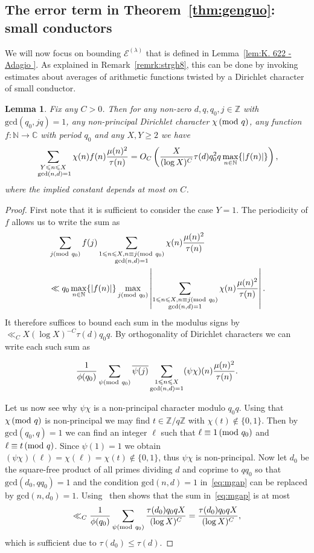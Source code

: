 \documentclass[a4paper,12pt,reqno]{amsart}
\numberwithin{equation}{section} \numberwithin{figure}{section}
\newcommand\Z{\mathbb{Z}}
\newcommand\N{\mathbb{N}}
\newcommand{\md}[1]{  \left(\textnormal{mod}\ #1\right)}
\renewcommand{\l}{\left}
\renewcommand{\r}{\right}
\renewcommand{\c}{\mathcal}
\renewcommand{\gcd}{\textrm{gcd}}
\renewcommand{\leq}{\leqslant}
\renewcommand{\geq}{\geqslant}
\renewcommand{\#}{\sharp}
\newtheorem{lemma}{Lemma}
\theoremstyle{definition}
\numberwithin{lemma}{section}
\newcommand{\beq}[2]
{
\begin{equation}
\label{#1}
{#2}
\end{equation}
}
\begin{document}
\subsection{The error term in Theorem~\ref{thm:genguo}: small conductors}
\label{s:smalcond} We will now focus on bounding $\c E^{(\lambda)}$ that is defined in Lemma~\ref{lem:K. 622 - Adagio }.
As explained in Remark~\ref{remrk:strgh8}, this can be done by invoking  
 estimates about  averages of arithmetic functions twisted by 
a Dirichlet character of small conductor.
\begin{lemma}  \label{lem:friediwsiegwalfsiz} Fix any $C >0 $. Then for any non-zero $d, q,q_0,j \in \Z$ with $\gcd(q_0,jq)=1$,
any non-principal Dirichlet character $\chi \md{q}$, any function 
$f:\N\to \mathbb C$ with period $q_0$
 and any $X,Y\geq 2 $  we have 
 \[
\sum_{\substack{ Y\leq n \leq X  \\ \text{ \rm gcd}(n,d)=1   } }  \chi (n) f(n) \frac{  \mu(n)^2}{\tau(n) }
=O_C\l( 
\frac{ X }{(\log X)^C} \tau(d) q_0^2 q   \max_{n\in \N}\{|f(n)| \}  \r)  ,\] where the implied constant depends at most on $C$. \end{lemma}
\begin{proof} First note that it is sufficient to consider the case $Y=1$.
The periodicity of $f$ allows us to write the sum as 
\begin{align*}
&\sum_{j\md {q_0}} f(j) 
\sum_{\substack{ 1\leq n \leq X , n\equiv j \md{q_0}  \\ \gcd(n,d)=1   } }  \chi (n)  \frac{  \mu(n)^2}{\tau(n) } \\
&\ll  q_0 \max_{n\in \N}\{|f(n)| \}
\max_{j\md {q_0}}
\l|
\sum_{\substack{ 1\leq n \leq X , n\equiv j \md{q_0}  \\ \gcd(n,d)=1   } }  \chi (n)  \frac{  \mu(n)^2}{\tau(n) }
\r|.
\end{align*}
It therefore suffices to bound each sum in the modulus signs by $\ll_C X(\log X)^{-C} \tau(d) q_0 q $.
By orthogonality of Dirichlet  characters we can write each such  sum as 
\beq{eq:mgap}{ \frac{1}{\phi(q_0)}\sum_{\psi \md {q_0  } } \overline{\psi(j) }\sum_{\substack{ 1\leq n \leq X \\ \gcd(n,d)=1   } } (\psi \chi)(n)\frac{  \mu(n)^2 }{\tau(n) } .}
Let us now see why    $\psi \chi $  is a non-principal   character modulo $q_0 q$. 
Using that  $\chi \md q $ is non-principal we may  find  $ t \in \Z/q\Z$ with $\chi(t)  \notin \{0,1\} $.  Then by   $\gcd(q_0,q)=1$ 
we can   find an integer  $\ell  $ such that $\ell   \equiv 1 \md{ q_0 }$  and $\ell \equiv t \md q $. Since $\psi(1)=1$ we obtain 
 $(\psi \chi ) (\ell) = \chi(\ell  )=\chi(t)  \notin\{0,1\}$, thus $ \psi \chi $ is non-principal. Now let  $d_0$   be the square-free
product of all 
primes dividing $d$ and   coprime to $qq_0$ so that $\gcd(d_0,qq_0)=1$ and the condition 
$\gcd(n,d)=1$ in~\eqref{eq:mgap} can be replaced by $\gcd(n,d_0)=1$. Using~\cite[Lem. 1]{MR2675875}
then shows that   the sum in~\eqref{eq:mgap} is at most
  \[  \ll_C \frac{1}{\phi(q_0)} \sum_{\psi \md {q_0  } }     \frac{\tau(d_0) q_0 q  X }{(\log X)^C}   =  
   \frac{\tau(d_0) q_0 q  X }{(\log X)^C}    ,\]  which is sufficient due to $\tau(d_0 )\leq  \tau(d) $.  \end{proof}
\end{document}
